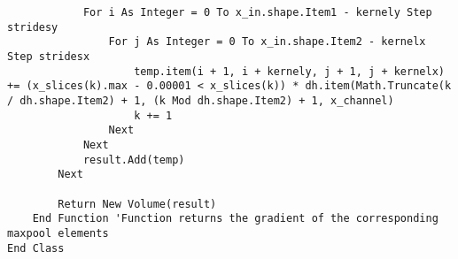\begin{verbatim}
            For i As Integer = 0 To x_in.shape.Item1 - kernely Step stridesy
                For j As Integer = 0 To x_in.shape.Item2 - kernelx Step stridesx
                    temp.item(i + 1, i + kernely, j + 1, j + kernelx) += (x_slices(k).max - 0.00001 < x_slices(k)) * dh.item(Math.Truncate(k / dh.shape.Item2) + 1, (k Mod dh.shape.Item2) + 1, x_channel)
                    k += 1
                Next
            Next
            result.Add(temp)
        Next

        Return New Volume(result)
    End Function 'Function returns the gradient of the corresponding maxpool elements
End Class
\end{verbatim}